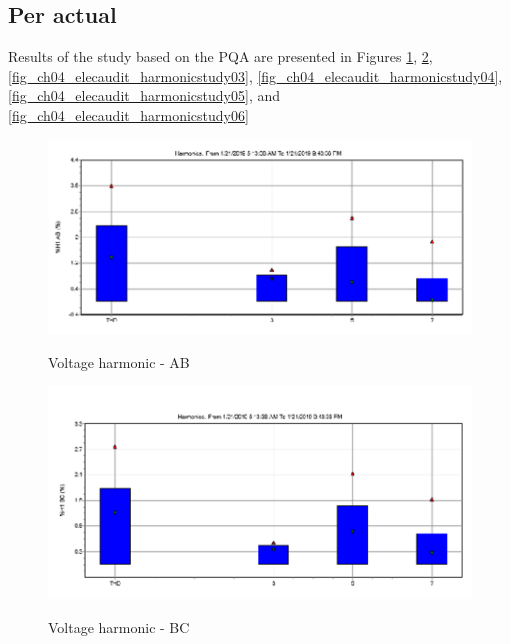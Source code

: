 \subsection{Per actual}
Results of the study based on the PQA are presented in Figures \ref{fig_ch04_elecaudit_harmonicstudy01}, \ref{fig_ch04_elecaudit_harmonicstudy02}, \ref{fig_ch04_elecaudit_harmonicstudy03}, \ref{fig_ch04_elecaudit_harmonicstudy04}, \ref{fig_ch04_elecaudit_harmonicstudy05}, and \ref{fig_ch04_elecaudit_harmonicstudy06}

\begin{figure}[!htb]
	\includegraphics[width=\textwidth]{figures/fig_ch04_elecaudit_harmonicstudy01} \\
	\caption{Voltage harmonic - AB}
	\label{fig_ch04_elecaudit_harmonicstudy01} 
\end{figure}

\begin{figure}[!htb]
	\includegraphics[width=\textwidth]{figures/fig_ch04_elecaudit_harmonicstudy02} \\
	\caption{Voltage harmonic - BC}
	\label{fig_ch04_elecaudit_harmonicstudy02} 
\end{figure}

